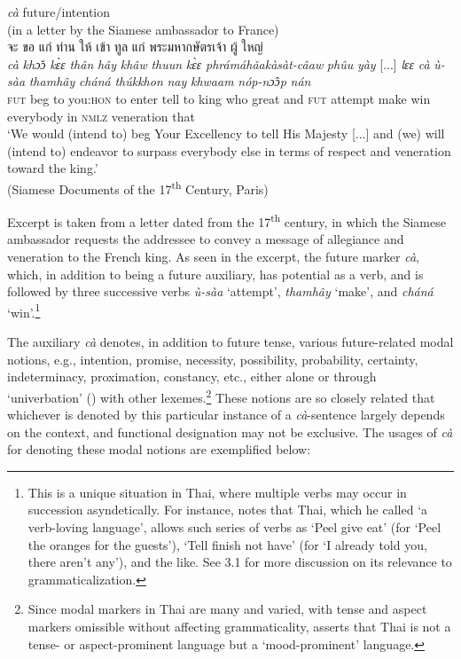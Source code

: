 \documentclass[output=paper,colorlinks,citecolor=brown]{langscibook}
\begin{document}
\ea \label{ex:4} \textit{cà} future/intention\\
(in a letter by the Siamese ambassador to France)\\
    \textthai{จะ} \textthai{ขอ} \textthai{แก่} \textthai{ท่าน} \textthai{ให้} \textthai{เข้า} \textthai{ทูล} \textthai{แก่} \textthai{พระมหากษัตรเจ้า} \textthai{ผู้} \textthai{ใหญ่} \textellipsis\\
         \gll \textit{cà} \textit{khɔ̌ɔ} \textit{kɛ̀ɛ} \textit{thân} \textit{hây} \textit{khâw} \textit{thuun} \textit{kɛ̀ɛ} \textit{phrámáhǎakàsàt-câaw} \textit{phûu} \textit{yày} [...] \textit{lɛɛ} \textit{cà} \textit{ù-sàa} \textit{thamhây} \textit{cháná} \textit{thúkkhon} \textit{nay} \textit{khwaam} \textit{nóp-nɔ̂ɔp} \textit{nán}\\
         \textsc{fut} beg to you:\textsc{hon} to enter tell to king who great {} and \textsc{fut} attempt make win everybody in \textsc{nmlz} veneration that\\
    \glt ‘We would (intend to) beg Your Excellency to tell His Majesty [...] and (we) will (intend to) endeavor to surpass everybody else in terms of respect and veneration toward the king.’\\
    \hfill (Siamese Documents of the 17\textsuperscript{th} Century, Paris)
\z

Excerpt  is taken from a letter dated from the 17\textsuperscript{th} century, in which the Siamese ambassador requests the addressee to convey a message of allegiance and veneration to the French king. As seen in the excerpt, the future marker \textit{cà}, which, in addition to being a future auxiliary, has potential as a verb, and is followed by three successive verbs \textit{ù-sàa} ‘attempt’, \textit{thamhây} ‘make’, and \textit{cháná} ‘win’.\footnote{This is a unique situation in Thai, where multiple verbs may occur in succession asyndetically. For instance, \citet[160]{Diller2006} notes that Thai, which he called ‘a verb-loving language’, allows such series of verbs as ‘Peel give eat’ (for ‘Peel the oranges for the guests’), ‘Tell finish not have’ (for ‘I already told you, there aren’t any’), and the like. See 3.1 for more discussion on its relevance to grammaticalization.}

The auxiliary \textit{cà} denotes, in addition to future tense, various future-related modal notions, e.g., intention, promise, necessity, possibility, probability, certainty, indeterminacy, proximation, constancy, etc., either alone or through ‘univerbation’ (\cite{Lehmann2015}) with other lexemes.\footnote{Since modal markers in Thai are many and varied, with tense and aspect markers omissible without affecting grammaticality, \citet[114]{Soithurum2010} asserts that Thai is not a tense- or aspect-prominent language but a ‘mood-prominent’ language.} These notions are so closely related that whichever is denoted by this particular instance of a \textit{cà}-sentence largely depends on the context, and functional designation may not be exclusive. The usages of \textit{cà} for denoting these modal notions are exemplified below:
\end{document}
